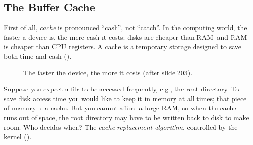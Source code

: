 \subsection{The Buffer Cache}

First of all, \emph{cache} is pronounced ``cash'', not ``catch''. In the computing world, the faster a device is, the more cash it costs: disks are cheaper than RAM, and RAM is cheaper than CPU registers. A cache is a temporary storage designed to save both time and cash ().

\begin{figure}[H]
\centering
{}
\caption{The faster the device, the more it costs (after slide 203).}
\label{fig:cachehier}
\end{figure}

Suppose you expect a file to be accessed frequently, e.g., the root directory. To save disk access time you would like to keep it in memory at all times; that piece of memory is a cache. But you cannot afford a large RAM, so when the cache runs out of space, the root directory may have to be written back to disk to make room. Who decides when? The \emph{cache replacement algorithm}, controlled by the kernel ().


